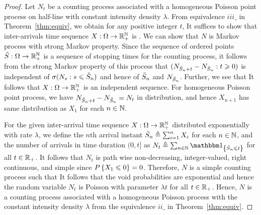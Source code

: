 \documentclass[letterpaper,10pt,english]{article}
\begin{document}
\begin{proof}
Let $N_t$ be a counting process associated with a homogeneous Poisson point process on half-line with constant intensity density $\lambda$. 
From equivalence $iii\_$ in Theorem~\ref{thm:equiv}, we obtain for any positive integer $t$, 
It suffices to show that inter-arrivals time sequence $X:\Omega\to\mathbb{R}_+^{\mathbb{N}}$ is \iid.  
We can show that $N$ is Markov process with strong Markov property. 
Since the sequence of ordered points $\tilde{S}:\Omega\to\mathbb{R}_+^{\mathbb{N}}$ is a sequence of stopping times for the counting process, 
it follows from the strong Markov property of this process that $(N_{\tilde{S}_n+t} - N_{\tilde{S}_n}: t \geqslant 0)$ is independent of $\sigma(N_s: s \leqslant \tilde{S}_n)$ and hence of $\tilde{S}_n$ and $N_{\tilde{S}_n}$. 
Further, we see that
It follows that $X:\Omega\to\mathbb{R}_+^{\mathbb{N}}$ is an independent sequence. 
For homogeneous Poisson point process, we have $N_{\tilde{S}_n+t}-N_{\tilde{S}_n} = N_t$ in distribution, 
and hence $X_{n+1}$ has same distribution as $X_1$ for each $n \in \mathbb{N}$. 

For the given \iid inter-arrival time sequence $X:\Omega\to\mathbb{R}_+^{\mathbb{N}}$ distributed exponentially with rate $\lambda$, we define the $n$th arrival instant $\tilde{S}_n \triangleq \sum_{i=1}^nX_i$ for each $n \in \mathbb{N}$, and the number of arrivals in time duration $(0,t]$ as $N_t\triangleq \sum_{n\in\N}\SetIn{\tS_n\le t}$ for all $t\in \mathbb{R}_+$. 
It follows that $N_t$ is path wise non-decreasing, integer-valued, right continuous, and simple since $P\left\{X_1 \leqslant 0\right\} = 0$. 
Therefore, $N$ is a simple counting process such that 
It follows that the void probabilities are exponential and hence the random variable $N_t$ is Poisson with parameter $\lambda t$ for all $t \in \mathbb{R}_+$. 
Hence, $N$ is a counting process associated with a homogeneous Poisson process with the constant intensity density $\lambda$ from the equivalence $ii\_$ in Theorem~\ref{thm:equiv}. 
\end{proof}
\end{document}
